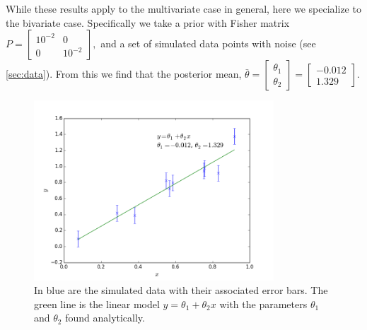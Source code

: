 \documentclass[a4paper,11pt,twoside]{article}
\begin{document}
While these results apply to the multivariate case in general, here we
specialize to the bivariate case. Specifically we take a prior with Fisher matrix
	$ P = \begin{bmatrix}
		10^{-2} & 0 \\
		0 & 10^{-2}
	\end{bmatrix}, $
and a set of simulated data points with noise (see \cref{sec:data}).
From this we find that the posterior mean, 
	$\bar{\theta} = \begin{bmatrix} 
		\theta_1 \\ 
		\theta_2 \end{bmatrix} = \begin{bmatrix} 
		-0.012 \\ 
	1.329 \end{bmatrix}$.

\begin{figure}[!ht]
	\centering
	\includegraphics[width=0.8\textwidth]{2ddata.png}
	\caption{In blue are the simulated data with their associated
	error bars. The green line is the linear model $y = \theta_1 + \theta_2
	x$ with the parameters $\theta_1$ and $\theta_2$ found analytically.}
	\label{fig:model}
\end{figure}
\end{document}
